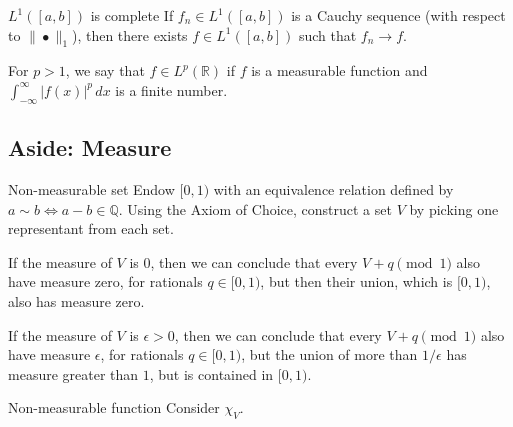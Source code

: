 
\begin{thm}{\(L^1([a, b])\) is complete}{}
	If \(f_n \in L^1([a, b])\) is a Cauchy sequence (with respect to \(\|\bullet\|_1\)), then there exists \(f \in L^1([a, b])\) such that \(f_n \to f\).
\end{thm}

\begin{defn}{}{}
	For \(p > 1\), we say that \(f \in L^p(\mathbb{R})\) if \(f\) is a measurable function and \(\int_{-\infty}^\infty |f(x)|^p\,dx\) is a finite number.
\end{defn}

\subsection{Aside: Measure}

\begin{exmp}{Non-measurable set}{}	
	Endow \([0, 1)\) with an equivalence relation defined by \(a \sim b \iff a - b \in \mathbb{Q}\). 
	Using the Axiom of Choice, construct a set \(V\) by picking one representant from each set.

	If the measure of \(V\) is \(0\), then we can conclude that every \(V + q \pmod{1}\) also have measure zero, for rationals \(q \in [0, 1)\), but then their union, which is \([0, 1)\), also has measure zero.

	If the measure of \(V\) is \(\epsilon > 0\), then we can conclude that every \(V + q \pmod{1}\) also have measure \(\epsilon\), for rationals \(q \in [0, 1)\), but the union of more than \(1/\epsilon\) has measure greater than \(1\), but is contained in \([0, 1)\).
\end{exmp}

\begin{exmp}{Non-measurable function}{}
	Consider \(\chi_{V}\).
\end{exmp}
